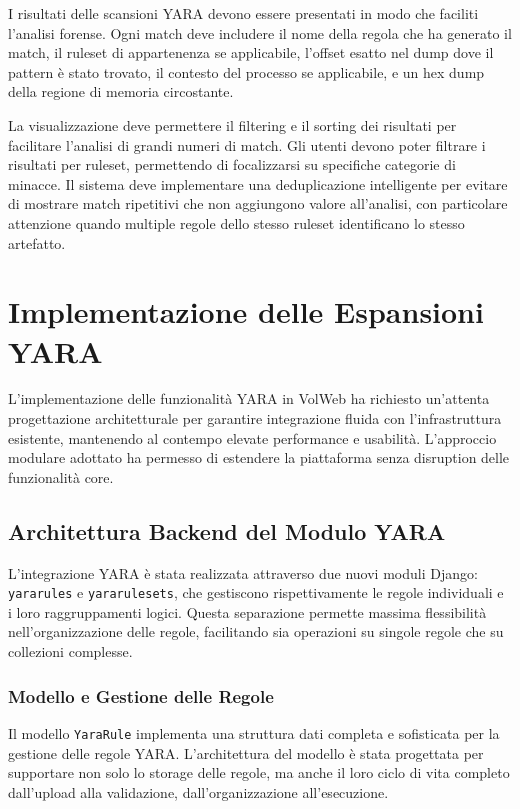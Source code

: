 I risultati delle scansioni YARA devono essere presentati in modo che faciliti l'analisi forense. Ogni match deve includere il nome della regola che ha generato il match, il ruleset di appartenenza se applicabile, l'offset esatto nel dump dove il pattern è stato trovato, il contesto del processo se applicabile, e un hex dump della regione di memoria circostante.

La visualizzazione deve permettere il filtering e il sorting dei risultati per facilitare l'analisi di grandi numeri di match. Gli utenti devono poter filtrare i risultati per ruleset, permettendo di focalizzarsi su specifiche categorie di minacce. Il sistema deve implementare una deduplicazione intelligente per evitare di mostrare match ripetitivi che non aggiungono valore all'analisi, con particolare attenzione quando multiple regole dello stesso ruleset identificano lo stesso artefatto.

\section{Implementazione delle Espansioni YARA}

L'implementazione delle funzionalità YARA in VolWeb ha richiesto un'attenta progettazione architetturale per garantire integrazione fluida con l'infrastruttura esistente, mantenendo al contempo elevate performance e usabilità. L'approccio modulare adottato ha permesso di estendere la piattaforma senza disruption delle funzionalità core.

\subsection{Architettura Backend del Modulo YARA}

L'integrazione YARA è stata realizzata attraverso due nuovi moduli Django: \texttt{yararules} e \texttt{yararulesets}, che gestiscono rispettivamente le regole individuali e i loro raggruppamenti logici. Questa separazione permette massima flessibilità nell'organizzazione delle regole, facilitando sia operazioni su singole regole che su collezioni complesse.

\subsubsection{Modello e Gestione delle Regole}

Il modello \texttt{YaraRule} implementa una struttura dati completa e sofisticata per la gestione delle regole YARA. L'architettura del modello è stata progettata per supportare non solo lo storage delle regole, ma anche il loro ciclo di vita completo dall'upload alla validazione, dall'organizzazione all'esecuzione.

